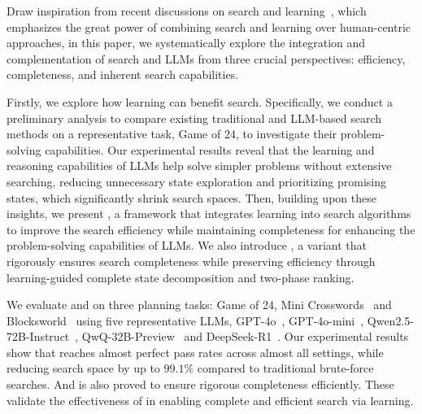 Draw inspiration from recent discussions on search and learning~\cite{Sutton2019BitterLesson,snell2024scaling}, which emphasizes the great power of combining search and learning over human-centric approaches, in this paper, we systematically explore the integration and complementation of search and LLMs from three crucial perspectives: efficiency, completeness, and inherent search capabilities. 

Firstly, we explore how learning can benefit search. Specifically, we conduct a preliminary analysis to compare existing traditional and LLM-based search methods on a representative task, Game of 24, to investigate their problem-solving capabilities. Our experimental results reveal that the learning and reasoning capabilities of LLMs help solve simpler problems without extensive searching, reducing unnecessary state exploration and prioritizing promising states, which significantly shrink search spaces. 
Then, building upon these insights, we present \method, a framework that integrates learning into search algorithms to improve the search efficiency while maintaining completeness for enhancing the problem-solving capabilities of LLMs. 
We also introduce \cmethod, a variant that rigorously ensures search completeness while preserving efficiency through learning-guided complete state decomposition and two-phase ranking. 

We evaluate \method and \cmethod on three planning tasks: Game of 24, Mini Crosswords~\cite{yao2023tree} and Blocksworld~\cite{valmeekam2022large} using five representative LLMs, GPT-4o~\cite{gpt4ocard}, GPT-4o-mini~\cite{achiam2023gpt}, Qwen2.5-72B-Instruct~\cite{qwen2.5}, QwQ-32B-Preview~\cite{qwq-32b-preview} and DeepSeek-R1~\cite{deepseekai2025deepseekr1}. Our experimental results show that \method reaches almost perfect pass rates across almost all settings, while reducing search space 
by up to $99.1\%$ compared to traditional brute-force searches. And \cmethod is also proved to ensure rigorous completeness efficiently. These validate the effectiveness of \method in enabling complete and efficient search via learning. 

